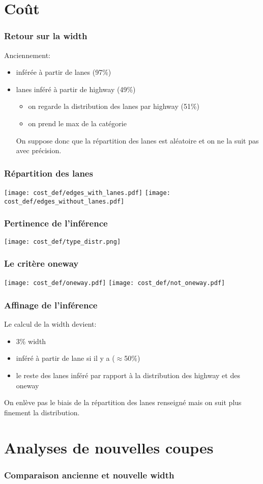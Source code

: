 \documentclass[aspectratio=169]{beamer}
\begin{document}
    \section{Coût}
    \begin{frame}
        \frametitle{Retour sur la width}
        Anciennement:
        \begin{itemize}
            \item inférée à partir de lanes (97\%)
            \item lanes inféré à partir de highway (49\%)
            \begin{itemize}
                \item on regarde la distribution des lanes par highway (51\%)
                \item on prend le max de la catégorie
            \end{itemize}
            On suppose donc que la répartition des lanes est aléatoire et on ne la suit pas avec précision.
        \end{itemize}    
    \end{frame}

    \begin{frame}
        \frametitle{Répartition des lanes}
        \centering
        \texttt{[image: cost\_def/edges\_with\_lanes.pdf]}
        \texttt{[image: cost\_def/edges\_without\_lanes.pdf]}
    \end{frame}
    
    \begin{frame}
        \frametitle{Pertinence de l'inférence}
        \centering
        \texttt{[image: cost\_def/type\_distr.png]}
    \end{frame}

    \begin{frame}
        \frametitle{Le critère oneway}
        \centering
        \texttt{[image: cost\_def/oneway.pdf]}
        \texttt{[image: cost\_def/not\_oneway.pdf]}
    
    \end{frame}
    \begin{frame}
        \frametitle{Affinage de l'inférence}
        Le calcul de la width devient:
        \begin{itemize}
            \item 3\% width
            \item inféré à partir de lane si il y a ($\approx$50\%)
            \item le reste des lanes inféré par rapport à la distribution des highway et des oneway
        \end{itemize}
        On enlève pas le biais de la répartition des lanes renseigné mais on suit plus finement la distribution.
    \end{frame}

    \section{Analyses de nouvelles coupes}
    \begin{frame}
        \frametitle{Comparaison ancienne et nouvelle width}
    
    
    \end{frame}
\end{document}
